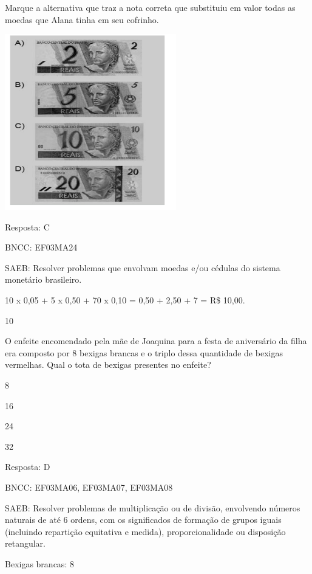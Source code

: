 \begin{escolha}
{\begin{escolha}
{Marque a alternativa que traz a nota correta que substituiu em valor
todas as moedas que Alana tinha em seu cofrinho.


\includegraphics[width=2.93590in,height=3.00930in]{media/image135.png}

Resposta: C

BNCC: EF03MA24

SAEB: Resolver problemas que envolvam moedas e/ou cédulas do
sistema monetário brasileiro.

10 x 0,05 + 5 x 0,50 + 70 x 0,10 = 0,50 + 2,50 + 7 = R\$ 10,00.

\num{10}

O enfeite encomendado pela mãe de Joaquina para a festa de aniversário
da filha era composto por 8 bexigas brancas e o triplo dessa quantidade
de bexigas vermelhas. Qual o tota de bexigas presentes no enfeite?

\begin{escolha}

\item
  8
\item
  16
\item
  24
\item
  32
\end{escolha}

Resposta: D

BNCC: EF03MA06, EF03MA07, EF03MA08

SAEB: Resolver problemas de multiplicação ou de divisão,
envolvendo números naturais de até 6 ordens, com os significados de
formação de grupos iguais (incluindo repartição equitativa e medida),
proporcionalidade ou disposição retangular.

Bexigas brancas: 8

}
\end{escolha}}
\end{escolha}
